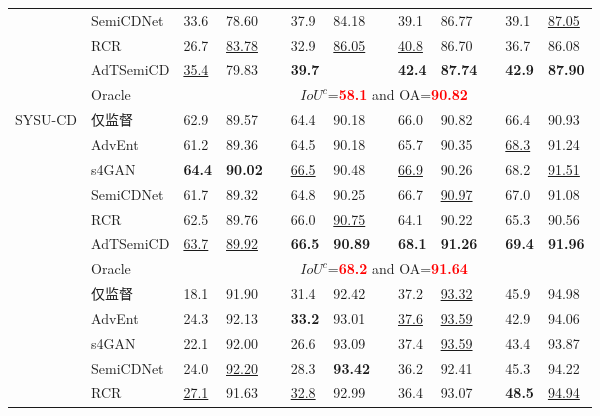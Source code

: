 \documentclass[lang=chs, degree=master, blindreview=false, adobe=false]{yanputhesis}
\begin{document}
\begin{table}[!htbp]
{\begin{tabular}{p{20mm}p{25mm}p{8mm}p{8mm}cp{8mm}p{8mm}cp{8mm}p{8mm}cp{8mm}p{8mm}}
      & SemiCDNet\cite{peng2021SemiCDNet} & 33.6 & 78.60 && 37.9 & 84.18 && 39.1 & 86.77 && 39.1 & \underline{87.05} \\ %
      & RCR\cite{bandara2022RCR}& 26.7 & \underline{83.78} && 32.9 & \underline{86.05} && \underline{40.8} & 86.70 && 36.7 & 86.08 \\
      \rowcolor{mycyan}
      \multirow{-8}{*}{\cellcolor{white}}& \cellcolor{white}AdTSemiCD   &   \cellcolor{white}\underline{35.4} & \cellcolor{white}79.83 && \textbf{39.7} & \cellcolor{white}{84.58} && \textbf{42.4} & \textbf{87.74} && \textbf{42.9} & \textbf{87.90} \\%
      \cline{2-13}
      & Oracle & \multicolumn{11}{c}{$ IoU^c$=\textcolor{red}{\bf 58.1} and OA=\textcolor{red}{\bf 90.82}} \\
      \bottomrule
      \multirow{8}{*}{SYSU-CD}
      & 仅监督   &   62.9 & 89.57 && 64.4 & 90.18 && 66.0 & 90.82 && 66.4 & 90.93 \\ %
      & AdvEnt\cite{vu2019advent}& 61.2 & 89.36 && 64.5 & 90.18 && 65.7 & 90.35 && \underline{68.3} & 91.24 \\ %
      & s4GAN\cite{mittal2019semi}& \cellcolor{mycyan}\textbf{64.4} & \cellcolor{mycyan}\textbf{90.02} && \underline{66.5} & 90.48 && \underline{66.9} & 90.26 && 68.2 & \underline{91.51} \\
      & SemiCDNet\cite{peng2021SemiCDNet} & 61.7 & 89.32 && 64.8 & 90.25 && 66.7 & \underline{90.97} && 67.0 & 91.08 \\ %
      & RCR\cite{bandara2022RCR}& 62.5 & 89.76 && 66.0 & \underline{90.75} && 64.1 & 90.22 && 65.3 & 90.56 \\

      \rowcolor{mycyan}
      \multirow{-8}{*}{\cellcolor{white}}& \cellcolor{white}AdTSemiCD   &   \cellcolor{white}\underline{63.7} & \cellcolor{white}\underline{89.92} && \textbf{66.5} & \textbf{90.89} && \textbf{68.1} & \textbf{91.26} && \textbf{69.4} & \textbf{91.96} \\%
      \cline{2-13}
      & Oracle & \multicolumn{11}{c}{$ IoU^c$=\textcolor{red}{\bf 68.2} and OA=\textcolor{red}{\bf 91.64}} \\
      \bottomrule
      \multirow{8}{*}{CL-CD}
      & 仅监督   &   18.1 & 91.90 && 31.4 & 92.42 && 37.2 & \underline{93.32} && 45.9 & 94.98 \\ %
      & AdvEnt\cite{vu2019advent}& 24.3 & 92.13 && \cellcolor{mycyan}\textbf{33.2} & 93.01 && \underline{37.6} & \underline{93.59} && 42.9 & 94.06 \\ %
      & s4GAN\cite{mittal2019semi}& 22.1 & 92.00 && 26.6 & 93.09 && 37.4 & \underline{93.59} && 43.4 & 93.87 \\
      & SemiCDNet\cite{peng2021SemiCDNet} & 24.0 & \underline{92.20} && 28.3 & \cellcolor{mycyan}\textbf{93.42} && 36.2 & 92.41 && 45.3 & 94.22 \\ %
      & RCR\cite{bandara2022RCR}& \underline{27.1} & 91.63 && \underline{32.8} & 92.99 && 36.4 & 93.07 && \cellcolor{mycyan}\textbf{48.5} & \underline{94.94} \\


\end{tabular}}
\end{table}
\end{document}
